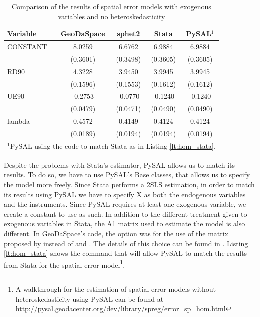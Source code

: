 \documentclass{article}
\begin{document}
\begin{table}[htpb]
\caption{Comparison of the results of spatial error models with exogenous variables and no heteroskedasticity}
\label{t:res_hom}
\centering
\begin{small}
\begin{tabular}{l|cccc} \hline
\textbf{Variable}&\textbf{GeoDaSpace}&\textbf{sphet2}&\textbf{Stata}&\textbf{PySAL$^1$}\\ \hline
CONSTANT&8.0259&6.6762&6.9884&6.9884\\
&(0.3601)&(0.3498)&(0.3605)&(0.3605)\\
RD90&4.3228&3.9450&3.9945&3.9945\\
&(0.1596)&(0.1553)&(0.1612)&(0.1612)\\
UE90&-0.2753&-0.0770&-0.1240&-0.1240\\
&(0.0479)&(0.0471)&(0.0490)&(0.0490)\\
lambda&0.4572&0.4149&0.4124&0.4124\\
&(0.0189)&(0.0194)&(0.0194)&(0.0194)\\
\hline
\multicolumn{5}{l}{\scriptsize{$^1$PySAL using the code to match Stata as in Listing \ref{lt:hom_stata}.}} \\
\end{tabular}
\end{small}
\end{table}


Despite the problems with Stata's estimator, PySAL allows us to match its results. To do so, we have to use PySAL's Base classes, that allows us to specify the model more freely. Since Stata performs a 2SLS estimation, in order to match its results using PySAL we have to specify X as both the endogenous variables and the instruments. Since PySAL requires at least one exogenous variable, we create a constant to use as such. In addition to the different treatment given to exogenous variables in Stata, the A1 matrix used to estimate the model is also different. In GeoDaSpace's code, the option was for the use of the matrix proposed by \citet{Arraiz10} instead of \citet{Drukker10} and \citet{Drukker11}. The details of this choice can be found in \citet{Anselin11}. Listing \ref{lt:hom_stata} shows the command that will allow PySAL to match the results from Stata for the spatial error model\footnote{A walkthrough for the estimation of spatial error models without heteroskedasticity using PySAL can be found at \url{http://pysal.geodacenter.org/dev/library/spreg/error_sp_hom.html}}. 
\end{document}
